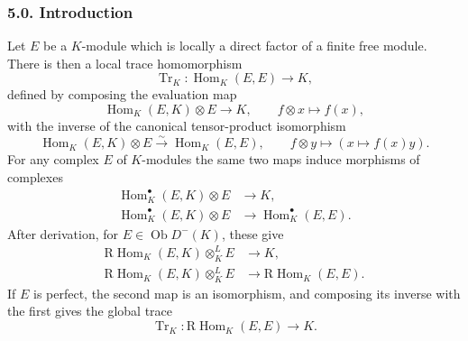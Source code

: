 \documentclass[12pt]{article}
\newcommand{\Hom}{\operatorname{Hom}}
\newcommand{\Tr}{\operatorname{Tr}}
\newcommand{\ob}{\operatorname{Ob}}
\newcommand{\R}{\mathrm R}
\begin{document}
\subsubsection*{5.0. Introduction}
Let $E$ be a $K$-module which is locally a direct factor of a finite free module. There is then a local trace homomorphism
\begin{equation}
   \Tr_K:\Hom_K(E,E)\to K,
   \tag{5.0.1}
\end{equation}
defined by composing the evaluation map
\begin{equation}
   \Hom_K(E,K)\otimes E\to K,
   \qquad f\otimes x\mapsto f(x),
   \tag{5.0.2}
\end{equation}
with the inverse of the canonical tensor-product isomorphism
\begin{equation}
   \Hom_K(E,K)\otimes E\xrightarrow{\sim}\Hom_K(E,E),
   \qquad f\otimes y\mapsto (x\mapsto f(x)y).
   \tag{5.0.3}
\end{equation}
For any complex $E$ of $K$-modules the same two maps induce morphisms of complexes
\begin{align}
   \Hom_K^{\bullet}(E,K)\otimes E&\to K,                         \tag{5.0.4}\\
   \Hom_K^{\bullet}(E,K)\otimes E&\to \Hom_K^{\bullet}(E,E).       \tag{5.0.5}
\end{align}
After derivation, for $E\in\ob D^-(K)$, these give
\begin{align}
   \R\Hom_K(E,K)\otimes_K^L E&\to K,                              \tag{5.0.6}\\
   \R\Hom_K(E,K)\otimes_K^L E&\to \R\Hom_K(E,E).                   \tag{5.0.7}
\end{align}
If $E$ is perfect, the second map is an isomorphism, and composing its inverse with the first gives the global trace
\begin{equation}
   \Tr_K:\R\Hom_K(E,E)\to K.                                      \tag{5.0.8}
\end{equation}
\end{document}
